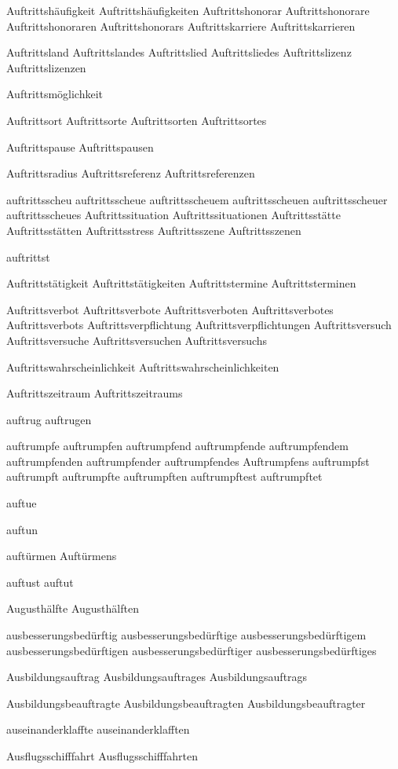 Auftrittshäufigkeit
Auftrittshäufigkeiten
Auftrittshonorar
Auftrittshonorare
Auftrittshonoraren
Auftrittshonorars
Auftrittskarriere
Auftrittskarrieren

Auftrittsland
Auftrittslandes
Auftrittslied
Auftrittsliedes
Auftrittslizenz
Auftrittslizenzen

Auftrittsmöglichkeit

Auftrittsort
Auftrittsorte
Auftrittsorten
Auftrittsortes

Auftrittspause
Auftrittspausen

Auftrittsradius
Auftrittsreferenz
Auftrittsreferenzen

auftrittsscheu
auftrittsscheue
auftrittsscheuem
auftrittsscheuen
auftrittsscheuer
auftrittsscheues
Auftrittssituation
Auftrittssituationen
Auftrittsstätte
Auftrittsstätten
Auftrittsstress
Auftrittsszene
Auftrittsszenen

auftrittst

Auftrittstätigkeit
Auftrittstätigkeiten
Auftrittstermine
Auftrittsterminen

Auftrittsverbot
Auftrittsverbote
Auftrittsverboten
Auftrittsverbotes
Auftrittsverbots
Auftrittsverpflichtung
Auftrittsverpflichtungen
Auftrittsversuch
Auftrittsversuche
Auftrittsversuchen
Auftrittsversuchs

Auftrittswahrscheinlichkeit
Auftrittswahrscheinlichkeiten

Auftrittszeitraum
Auftrittszeitraums

auftrug
auftrugen

auftrumpfe
auftrumpfen
auftrumpfend
auftrumpfende
auftrumpfendem
auftrumpfenden
auftrumpfender
auftrumpfendes
Auftrumpfens
auftrumpfst
auftrumpft
auftrumpfte
auftrumpften
auftrumpftest
auftrumpftet

auftue

auftun

auftürmen
Auftürmens

auftust
auftut

Augusthälfte
Augusthälften

ausbesserungsbedürftig
ausbesserungsbedürftige
ausbesserungsbedürftigem
ausbesserungsbedürftigen
ausbesserungsbedürftiger
ausbesserungsbedürftiges

Ausbildungsauftrag
Ausbildungsauftrages
Ausbildungsauftrags

Ausbildungsbeauftragte
Ausbildungsbeauftragten
Ausbildungsbeauftragter

auseinanderklaffte
auseinanderklafften

Ausflugsschifffahrt
Ausflugsschifffahrten

